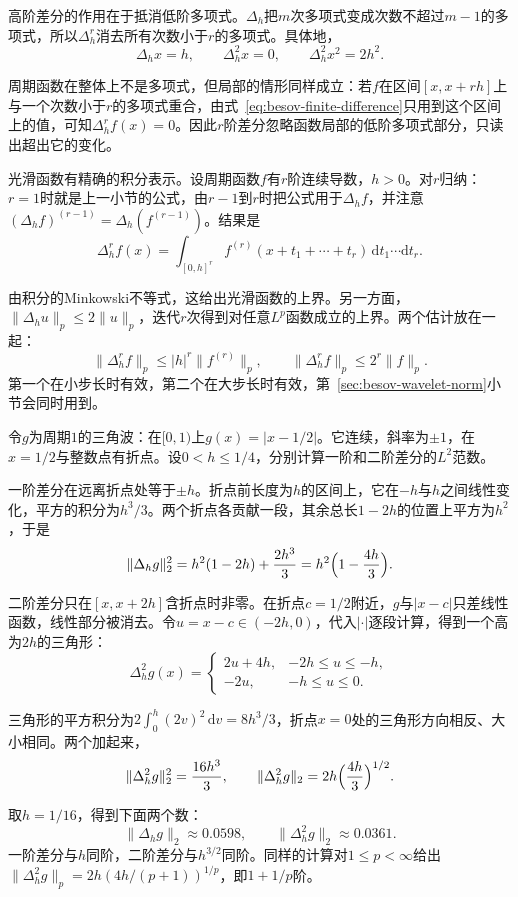 高阶差分的作用在于抵消低阶多项式。$\Delta_h$把$m$次多项式变成次数不超过$m-1$的多项式，所以$\Delta_h^r$消去所有次数小于$r$的多项式。具体地，
\[
 \Delta_hx=h,\qquad\Delta_h^2x=0,\qquad\Delta_h^2x^2=2h^2 .
\]

周期函数在整体上不是多项式，但局部的情形同样成立：若$f$在区间$[x,x+rh]$上与一个次数小于$r$的多项式重合，由式~\eqref{eq:besov-finite-difference}只用到这个区间上的值，可知$\Delta_h^rf(x)=0$。因此$r$阶差分忽略函数局部的低阶多项式部分，只读出超出它的变化。

光滑函数有精确的积分表示。设周期函数$f$有$r$阶连续导数，$h>0$。对$r$归纳：$r=1$时就是上一小节的公式，由$r-1$到$r$时把公式用于$\Delta_hf$，并注意$(\Delta_hf)^{(r-1)}=\Delta_h(f^{(r-1)})$。结果是
\[
 \Delta_h^rf(x)=\int_{[0,h]^r}f^{(r)}(x+t_1+\cdots+t_r)\,\mathrm dt_1\cdots\mathrm dt_r .
\]

由积分的Minkowski不等式，这给出光滑函数的上界。另一方面，$\lVert\Delta_hu\rVert_p\leq2\lVert u\rVert_p$，迭代$r$次得到对任意$L^p$函数成立的上界。两个估计放在一起：
\begin{equation}
 \lVert\Delta_h^rf\rVert_p\leq\lvert h\rvert^r\lVert f^{(r)}\rVert_p,\qquad\lVert\Delta_h^rf\rVert_p\leq2^r\lVert f\rVert_p .
 \label{eq:besov-difference-bounds}
\end{equation}
第一个在小步长时有效，第二个在大步长时有效，第~\ref{sec:besov-wavelet-norm}小节会同时用到。

\begin{example}[折线的二阶差分]
\label{ex:besov-triangle-wave}
令$g$为周期$1$的三角波：在$[0,1)$上$g(x)=\lvert x-1/2\rvert$。它连续，斜率为$\pm1$，在$x=1/2$与整数点有折点。设$0<h\leq1/4$，分别计算一阶和二阶差分的$L^2$范数。

一阶差分在远离折点处等于$\pm h$。折点前长度为$h$的区间上，它在$-h$与$h$之间线性变化，平方的积分为$h^3/3$。两个折点各贡献一段，其余总长$1-2h$的位置上平方为$h^2$，于是
\[
 \lVert\Delta_hg\rVert_2^2=h^2(1-2h)+\frac{2h^3}{3}=h^2\Bigl(1-\frac{4h}{3}\Bigr).
\]

二阶差分只在$[x,x+2h]$含折点时非零。在折点$c=1/2$附近，$g$与$\lvert x-c\rvert$只差线性函数，线性部分被消去。令$u=x-c\in(-2h,0)$，代入$\lvert\cdot\rvert$逐段计算，得到一个高为$2h$的三角形：
\[
 \Delta_h^2g(x)=
 \begin{cases}
 2u+4h,&-2h\leq u\leq-h,\\
 -2u,&-h\leq u\leq0.
 \end{cases}
\]

三角形的平方积分为$2\int_0^h(2v)^2\,\mathrm dv=8h^3/3$，折点$x=0$处的三角形方向相反、大小相同。两个加起来，
\[
 \lVert\Delta_h^2g\rVert_2^2=\frac{16h^3}{3},\qquad\lVert\Delta_h^2g\rVert_2=2h\Bigl(\frac{4h}{3}\Bigr)^{1/2}.
\]

取$h=1/16$，得到下面两个数：
\[
 \lVert\Delta_hg\rVert_2\approx0.0598,\qquad\lVert\Delta_h^2g\rVert_2\approx0.0361 .
\]
一阶差分与$h$同阶，二阶差分与$h^{3/2}$同阶。同样的计算对$1\leq p<\infty$给出$\lVert\Delta_h^2g\rVert_p=2h(4h/(p+1))^{1/p}$，即$1+1/p$阶。
\end{example}

